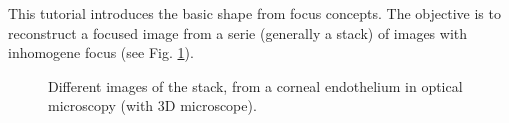 \def\difficulty{1}

\label{lbl:tutorial:sff}
\begin{note}This tutorial introduces the basic shape from focus concepts. The objective is to reconstruct a focused image from a serie (generally a stack) of images with inhomogene focus (see Fig. \ref{fig:stack}).\end{note}

\begin{figure}[htbp]
\centering\caption{Different images of the stack, from a corneal endothelium in optical microscopy (with 3D microscope).}%
 \hfill
 
 \hfill
 \label{fig:stack}%
\end{figure}


